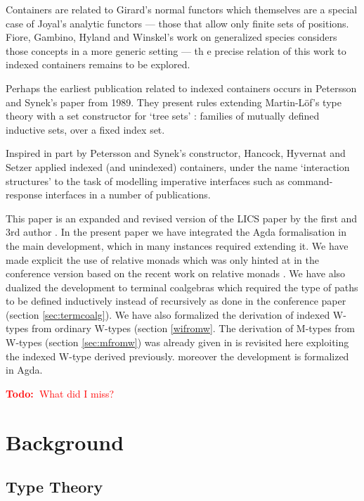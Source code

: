 \documentclass[a4paper]{article}
\newcommand{\todo}[1]{\textcolor{red}{\textbf{Todo:~}#1}}
\begin{document}
Containers are related to Girard's normal functors \cite{GirardNormal} which
themselves are a special case of Joyal's analytic functors
\cite{JoyalA:fonaes} --- those that allow only finite sets of positions.
Fiore, Gambino, Hyland and Winskel's work on generalized species
\cite{fiore2008ccb} considers those concepts in a more generic setting ---
th e precise relation of this work to indexed containers remains to be
explored.

Perhaps the earliest publication related to indexed containers
occurs in Petersson and Synek's paper
\cite{PS89} from 1989. They present rules extending Martin-L{\"o}f's
type theory with a set constructor for `tree sets' : families of
mutually defined inductive sets, over a fixed index set.

Inspired in part by Petersson and Synek's constructor,
Hancock, Hyvernat and Setzer \cite{hancock-apal06} applied indexed (and unindexed)
containers, under the name `interaction structures' to the task of
modelling imperative interfaces such as command-response interfaces in
a number of publications. 

This paper is an expanded and revised version of the LICS paper by the
first and 3rd author \cite{lics}. In the present paper we have
integrated the Agda formalisation in the main development, which in
many instances required extending it. We have made explicit the use of
relative monads which was only hinted at in the conference version
based on the recent work on relative monads \cite{relmon}. We have
also dualized the development to terminal coalgebras which required
the type of paths to be defined inductively instead of recursively as
done in the conference paper (section \ref{sec:termcoalg}).  We
have also formalized the derivation of indexed W-types from ordinary
W-types (section \ref{wifromw}. The derivation of M-types from W-types
(section \ref{sec:mfromw})
was already given in \cite{C-CSPTs} is revisited here exploiting the
indexed W-type derived previously. moreover the development is formalized in
Agda. 

\todo{What did I miss?}


\section{Background}
\label{sec:background}

 

\subsection{Type Theory}
\end{document}
